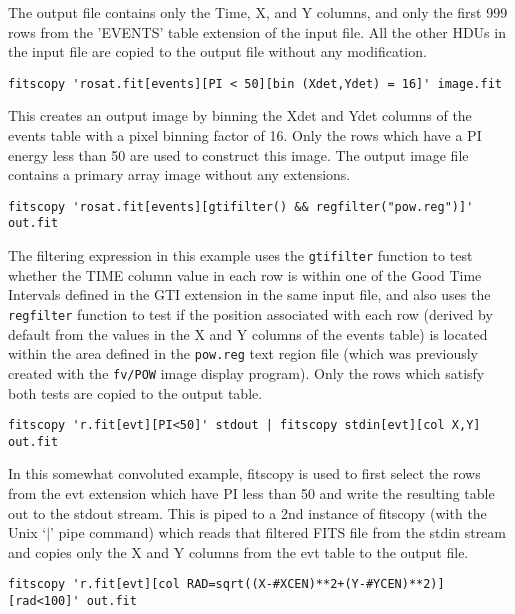 \documentclass[11pt]{article}
\begin{document}
The output file contains only the Time, X, and Y columns, and only
the first 999 rows from the 'EVENTS' table extension of the input file.
All the other HDUs in the input file are copied to the output file
without any modification.

\begin{verbatim}
fitscopy 'rosat.fit[events][PI < 50][bin (Xdet,Ydet) = 16]' image.fit
\end{verbatim}

This creates an output image by binning the Xdet and Ydet columns of
the events table with a pixel binning factor of 16.  Only the rows
which have a PI energy less than 50 are used to construct this image.
The output image file contains a primary array image without any
extensions.

\begin{verbatim}
fitscopy 'rosat.fit[events][gtifilter() && regfilter("pow.reg")]' out.fit
\end{verbatim}

The filtering expression in this example uses the {\tt gtifilter}
function to test whether the TIME column value in each row is within
one of the Good Time Intervals defined in the GTI extension in the same
input file, and also uses the {\tt regfilter} function to test if the
position associated with each row (derived by default from the values
in the X and Y columns of the events table) is located within the area
defined in the {\tt pow.reg} text region file (which was previously
created with the {\tt fv/POW} image display program).  Only the rows
which satisfy both tests are copied to the output table.

\begin{verbatim}
fitscopy 'r.fit[evt][PI<50]' stdout | fitscopy stdin[evt][col X,Y] out.fit
\end{verbatim}

In this somewhat convoluted example, fitscopy is used to first select
the rows from the evt extension which have PI less than 50 and write the
resulting table out to the stdout stream.  This is piped to a 2nd
instance of fitscopy (with the Unix `$|$' pipe command) which reads that
filtered FITS file from the stdin stream and copies only the X and Y
columns from the evt table to the output file.

\begin{verbatim}
fitscopy 'r.fit[evt][col RAD=sqrt((X-#XCEN)**2+(Y-#YCEN)**2)][rad<100]' out.fit
\end{verbatim}
\end{document}
